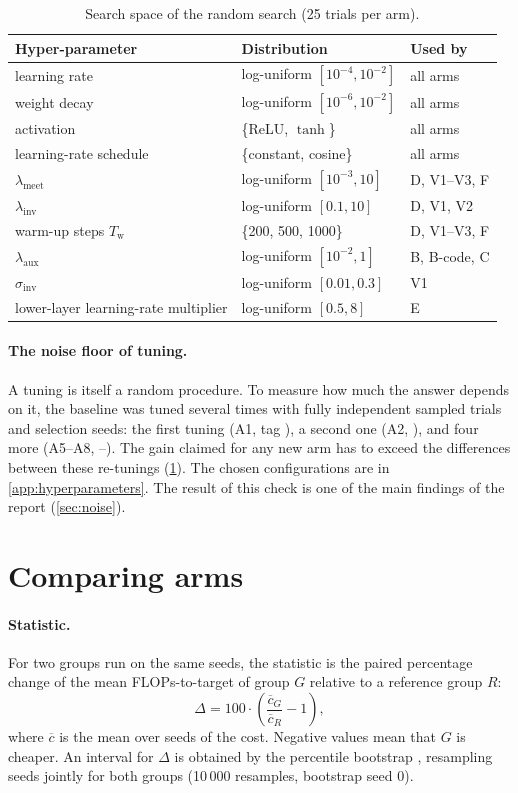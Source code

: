 \begin{table}[t]
\centering\small
\caption{Search space of the random search (25 trials per arm).}
\label{tab:space}
\begin{tabular}{@{}l l l@{}}
\toprule
Hyper-parameter & Distribution & Used by\\
\midrule
learning rate & log-uniform $[10^{-4},10^{-2}]$ & all arms\\
weight decay & log-uniform $[10^{-6},10^{-2}]$ & all arms\\
activation & \{ReLU, $\tanh$\} & all arms\\
learning-rate schedule & \{constant, cosine\} & all arms\\
$\lambda_{\mathrm{meet}}$ & log-uniform $[10^{-3},10]$ & D, V1--V3, F\\
$\lambda_{\mathrm{inv}}$ & log-uniform $[0.1,10]$ & D, V1, V2\\
warm-up steps $T_{\mathrm{w}}$ & \{200, 500, 1000\} & D, V1--V3, F\\
$\lambda_{\mathrm{aux}}$ & log-uniform $[10^{-2},1]$ & B, B-code, C\\
$\sigma_{\mathrm{inv}}$ & log-uniform $[0.01,0.3]$ & V1\\
lower-layer learning-rate multiplier & log-uniform $[0.5,8]$ & E\\
\bottomrule
\end{tabular}
\end{table}

\paragraph{The noise floor of tuning.} A tuning is itself a random procedure. To measure how much the answer depends on it, the baseline was tuned several times with fully independent sampled trials and selection seeds: the first tuning (A1, tag ), a second one (A2, ), and four more (A5--A8, --). The gain claimed for any new arm has to exceed the differences between these re-tunings (\cref{sec:stats}). The chosen configurations are in \cref{app:hyperparameters}. The result of this check is one of the main findings of the report (\cref{sec:noise}).

\section{Comparing arms}\label{sec:stats}
\paragraph{Statistic.} For two groups run on the same seeds, the statistic is the paired percentage change of the mean FLOPs-to-target of group $G$ relative to a reference group $R$:
\begin{equation}
\Delta = 100\cdot\left(\frac{\overline{c}_G}{\overline{c}_R}-1\right),
\end{equation}
where $\overline{c}$ is the mean over seeds of the cost. Negative values mean that $G$ is cheaper. An interval for $\Delta$ is obtained by the percentile bootstrap \citep{efron1993introduction}, resampling seeds jointly for both groups (10\,000 resamples, bootstrap seed 0).

